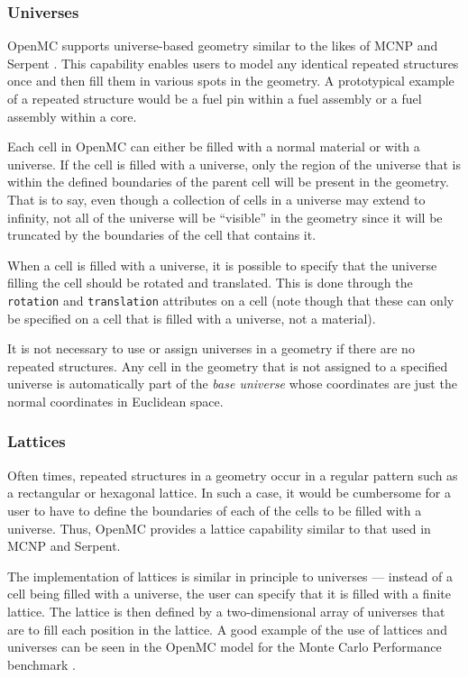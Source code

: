 \subsubsection{Universes}

OpenMC supports universe-based geometry similar to the likes of MCNP
\cite{lanl-x5-2008} and Serpent \cite{vtt-leppanen-2007}. This capability
enables users to model any identical repeated structures once and then fill them
in various spots in the geometry. A prototypical example of a repeated structure
would be a fuel pin within a fuel assembly or a fuel assembly within a core.

Each cell in OpenMC can either be filled with a normal material or with a
universe. If the cell is filled with a universe, only the region of the universe
that is within the defined boundaries of the parent cell will be present in the
geometry. That is to say, even though a collection of cells in a universe may
extend to infinity, not all of the universe will be ``visible'' in the geometry
since it will be truncated by the boundaries of the cell that contains it.

When a cell is filled with a universe, it is possible to specify that the
universe filling the cell should be rotated and translated. This is done through
the \texttt{rotation} and \texttt{translation} attributes on a cell (note though
that these can only be specified on a cell that is filled with a universe, not a
material).

It is not necessary to use or assign universes in a geometry if there are no
repeated structures. Any cell in the geometry that is not assigned to a
specified universe is automatically part of the \emph{base universe} whose
coordinates are just the normal coordinates in Euclidean space.

\subsubsection{Lattices}

Often times, repeated structures in a geometry occur in a regular pattern such
as a rectangular or hexagonal lattice. In such a case, it would be cumbersome
for a user to have to define the boundaries of each of the cells to be filled
with a universe. Thus, OpenMC provides a lattice capability similar to that used
in MCNP and Serpent.

The implementation of lattices is similar in principle to universes --- instead
of a cell being filled with a universe, the user can specify that it is filled
with a finite lattice. The lattice is then defined by a two-dimensional array of
universes that are to fill each position in the lattice. A good example of the
use of lattices and universes can be seen in the OpenMC model for the Monte
Carlo Performance benchmark \cite{romano-2012}.

